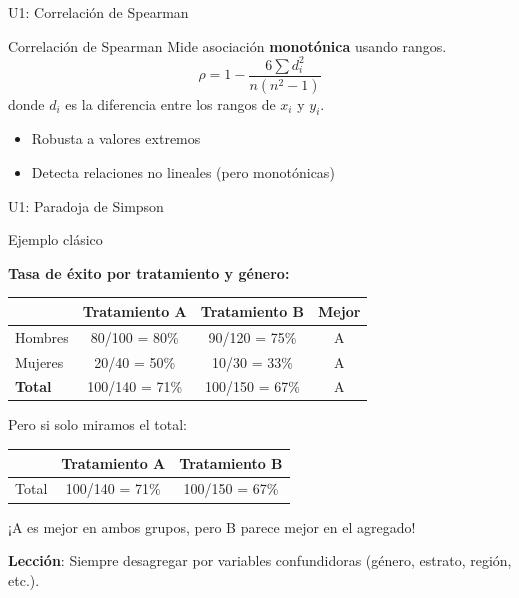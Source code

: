 \documentclass[aspectratio=169, 11pt]{beamer}
\begin{document}
\begin{frame}{U1: Correlación de Spearman}
\begin{block}{Correlación de Spearman}
Mide asociación \textbf{monotónica} usando rangos.
$$\rho = 1 - \frac{6\sum d_i^2}{n(n^2 - 1)}$$
donde $d_i$ es la diferencia entre los rangos de $x_i$ y $y_i$.
\begin{itemize}
\item Robusta a valores extremos
\item Detecta relaciones no lineales (pero monotónicas)
\end{itemize}
\end{block}
\end{frame}

\begin{frame}{U1: Paradoja de Simpson}
\begin{exampleblock}{Ejemplo clásico}
\small
\begin{center}
\renewcommand{\arraystretch}{1.2}
\textbf{Tasa de éxito por tratamiento y género:}

\vspace{0.2cm}
\begin{tabular}{lccc}
\toprule
 & \textbf{Tratamiento A} & \textbf{Tratamiento B} & \textbf{Mejor} \\
\midrule
Hombres & 80/100 = 80\% & 90/120 = 75\% & A \\
Mujeres & 20/40 = 50\% & 10/30 = 33\% & A \\
\midrule
\textbf{Total} & 100/140 = 71\% & 100/150 = 67\% & A \\
\bottomrule
\end{tabular}

\vspace{0.1cm}
Pero si solo miramos el total:
\begin{tabular}{lcc}
\toprule
 & \textbf{Tratamiento A} & \textbf{Tratamiento B} \\
\midrule
Total & 100/140 = 71\% & 100/150 = 67\% \\
\bottomrule
\end{tabular}
\end{center}

¡A es mejor en ambos grupos, pero B parece mejor en el agregado!
\end{exampleblock}

\textbf{Lección}: Siempre desagregar por variables confundidoras (género, estrato, región, etc.).
\end{frame}
\end{document}
